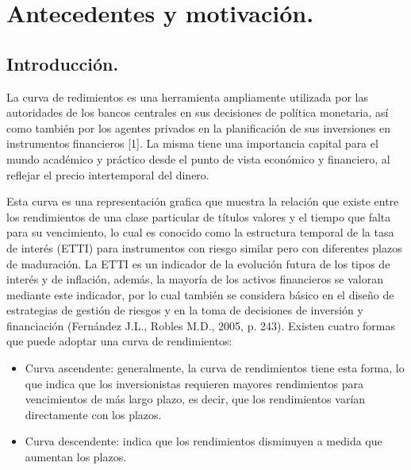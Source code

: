 \chapter{Antecedentes y motivaci\'on.}

\section{Introducci\'on.}

\hspace*{0.4 cm} La curva de redimientos es una herramienta ampliamente utilizada por las autoridades de los bancos centrales en sus decisiones de pol\'itica monetaria, as\'i como tambi\'en por los agentes privados en la planificaci\'on de sus inversiones en instrumentos financieros [1]. La misma tiene una importancia capital
para el mundo acad\'emico y pr\'actico desde el punto de vista econ\'omico y financiero, al reflejar el precio intertemporal del dinero.


\hspace*{0.4 cm} Esta curva es una representaci\'on grafica que muestra la relaci\'on que existe entre los rendimientos de una clase particular de t\'itulos valores y el tiempo que falta para su vencimiento, lo cual es conocido como la estructura temporal de la tasa de inter\'es (ETTI) para instrumentos con riesgo similar pero con diferentes plazos de maduraci\'on. La ETTI es un indicador de la evoluci\'on futura de los tipos de inter\'es y de inflaci\'on, adem\'as, la mayor\'ia de los activos financieros se valoran mediante este indicador, por lo cual tambi\'en se considera b\'asico en el dise\~no de estrategias de gesti\'on de riesgos y en la toma de decisiones de inversi\'on y financiaci\'on (Fern\'andez J.L., Robles M.D., 2005, p. 243). Existen cuatro formas que puede adoptar una curva de rendimientos:

\begin{itemize}
  \item Curva ascendente: generalmente, la curva de rendimientos tiene esta      forma, lo que indica que los inversionistas requieren mayores rendimientos     para vencimientos de m\'as largo plazo, es decir, que los rendimientos         var\'ian directamente con los plazos. 
  \item Curva descendente: indica que los rendimientos disminuyen a medida que   aumentan los plazos.
\end{itemize}

